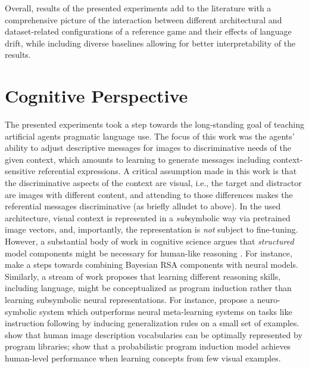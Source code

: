 Overall, results of the presented experiments add to the literature with a comprehensive picture of the interaction between different architectural and dataset-related configurations of a reference game and their effects of language drift, while including diverse baselines allowing for better interpretability of the results. 


\section{Cognitive Perspective}
The presented experiments took a step towards the long-standing goal of teaching artificial agents pragmatic language use. The focus of this work was the agents' ability to adjust descriptive messages for images to discriminative needs of the given context, which amounts to learning to generate messages including context-sensitive referential expressions. A critical assumption made in this work is that the discriminative aspects of the context are visual, i.e., the target and distractor are images with different content, and attending to those differences makes the referential messages discriminative (as briefly alludet to above). In the used architecture, visual context is represented in a \emph{sub}symbolic way via pretrained image vectors, and, importantly, the representation is \emph{not} subject to fine-tuning. However, a substantial body of work in cognitive science argues that \emph{structured} model components might be necessary for human-like reasoning \parencite[e.~g.,][]{tenenbaum2011grow, lake2017building}. For instance, \cite{monroe2015learning} make a steps towards combining Bayesian RSA components with neural models.
Similarly, a stream of work proposes that learning different reasoning skills, including language, might be conceptualized as program induction rather than learning subsymbolic neural representations. For instance, \cite{nye2020learning} propose a neuro-symbolic system which outperforms neural meta-learning systems on tasks like instruction following by inducing generalization rules on a small set of examples. \cite{wong2022identifying} show that human image description vocabularies can be optimally represented by program libraries; \cite{lake2015human} show that a probabilistic program induction model achieves human-level performance when learning concepts from few visual examples. 

